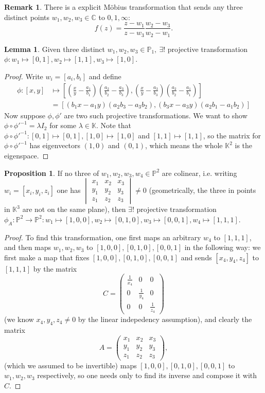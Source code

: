 \documentclass{article}
\newcommand{\C}{\mathbb{C}}
\newcommand{\K}{\mathbb{K}}
\newcommand{\p}{\mathbb{P}}
\theoremstyle{definition}
\newtheorem{prop}[defn]{Proposition}
\newtheorem{lemma}[defn]{Lemma}
\newtheorem{remark}[defn]{Remark}
\begin{document}
\begin{remark}
There is a explicit Möbius transformation that sends any three distinct points $w_1,w_2,w_3\in\C$ to $0,1,\infty$:
\[
f(z)=\frac{z-w_1}{z-w_3}\frac{w_2-w_3}{w_2-w_1}.
\]
\end{remark}
\begin{lemma}
Given three distinct $w_1,w_2,w_3\in\p_1,\ \exists!$ projective transformation $\phi:w_1\mapsto[0,1],w_2\mapsto[1,1],w_3\mapsto[1,0]$.
\end{lemma}
\begin{proof}
Write $w_i=[a_i,b_i]$ and define
\[
\begin{aligned}
\phi:[x,y]&\mapsto \left[\left(\frac{x}{y}-\frac{a_1}{b_1}\right)\left(\frac{a_2}{b_2}-\frac{a_3}{b_3}\right),\left(\frac{x}{y}-\frac{a_3}{b_3}\right)\left(\frac{a_2}{b_2}-\frac{a_1}{b_1}\right)\right]\\
&=[(b_1x-a_1y)(a_2b_3-a_3b_2),(b_3x-a_3y)(a_2b_1-a_1b_2)]
\end{aligned}
\]
Now suppose $\phi,\phi'$ are two such projective transformations. We want to show $\phi\circ\phi'^{-1}=\lambda I_2$ for some $\lambda\in\K$. Note that $\phi\circ\phi'^{-1}:[0,1]\mapsto [0,1],[1,0]\mapsto [1,0]$ and $[1,1]\mapsto [1,1]$, so the matrix for $\phi\circ\phi'^{-1}$ has eigenvectors $(1,0)$ and $(0,1)$, which means the whole $\K^2$ is the eigenspace.
\end{proof}

\begin{prop}
If no three of $w_1,w_2,w_3,w_4\in\p^2$ are colinear, i.e. writing $w_i=[x_i,y_i,z_i]$ one has $\begin{vmatrix}
x_1 & x_2 & x_3 \\ y_1 & y_2 & y_3 \\ z_1 & z_2 & z_3
\end{vmatrix}\neq 0$ (geometrically, the three in points in $\K^3$ are not on the same plane), then $\exists!$ projective transformation $\phi_A:\p^2\rightarrow\p^2:w_1\mapsto [1,0,0],w_2\mapsto [0,1,0],w_3\mapsto [0,0,1],w_4\mapsto [1,1,1]$.
\end{prop}
\begin{proof}
To find this transformation, one first maps an arbitrary $w_4$ to $[1,1,1]$, and then maps $w_1,w_2,w_3$ to $[1,0,0],[0,1,0],[0,0,1]$ in the following way: we first make a map that fixes $[1,0,0],[0,1,0],[0,0,1]$ and sends $[x_4,y_4,z_4]$ to $[1,1,1]$ by the matrix
\[
C=\begin{pmatrix}
\frac{1}{x_4} & 0 & 0 \\
0 & \frac{1}{y_4} & 0 \\
0 & 0 & \frac{1}{z_4}
\end{pmatrix}
\]
(we know $x_4,y_4,z_4\neq 0$ by the linear indepedency assumption), and clearly the matrix
\[
A=\begin{pmatrix}
x_1 & x_2 & x_3 \\ y_1 & y_2 & y_3 \\ z_1 & z_2 & z_3
\end{pmatrix},
\]
(which we assumed to be invertible) maps $[1,0,0],[0,1,0],[0,0,1]$ to $w_1,w_2,w_3$ respectively, so one needs only to find its inverse and compose it with $C$.
\end{proof}
\end{document}
